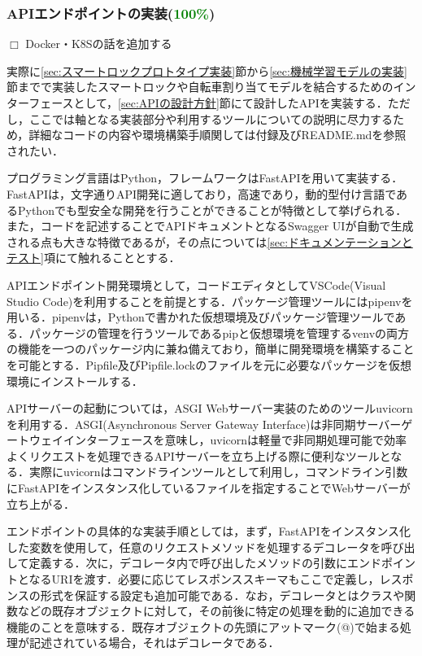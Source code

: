       \subsubsection{APIエンドポイントの実装(\textcolor{green}{100\%})}
        \label{sec:APIエンドポイントの実装}
          \par $\Box$ Docker・K8Sの話を追加する
          \par 実際に\ref{sec:スマートロックプロトタイプ実装}節から\ref{sec:機械学習モデルの実装}節までで実装したスマートロックや自転車割り当てモデルを結合するためのインターフェースとして，\ref{sec:APIの設計方針}節にて設計したAPIを実装する．ただし，ここでは軸となる実装部分や利用するツールについての説明に尽力するため，詳細なコードの内容や環境構築手順関しては付録及びREADME.mdを参照されたい．
          \par プログラミング言語はPython，フレームワークはFastAPIを用いて実装する．FastAPIは，文字通りAPI開発に適しており，高速であり，動的型付け言語であるPythonでも型安全な開発を行うことができることが特徴として挙げられる．また，コードを記述することでAPIドキュメントとなるSwagger UIが自動で生成される点も大きな特徴であるが，その点については\ref{sec:ドキュメンテーションとテスト}項にて触れることとする．
          \par APIエンドポイント開発環境として，コードエディタとしてVSCode(Visual Studio Code)を利用することを前提とする．パッケージ管理ツールにはpipenvを用いる．pipenvは，Pythonで書かれた仮想環境及びパッケージ管理ツールである．パッケージの管理を行うツールであるpipと仮想環境を管理するvenvの両方の機能を一つのパッケージ内に兼ね備えており，簡単に開発環境を構築することを可能とする．Pipfile及びPipfile.lockのファイルを元に必要なパッケージを仮想環境にインストールする．
          \par APIサーバーの起動については，ASGI Webサーバー実装のためのツールuvicornを利用する．ASGI(Asynchronous Server Gateway Interface)は非同期サーバーゲートウェイインターフェースを意味し，uvicornは軽量で非同期処理可能で効率よくリクエストを処理できるAPIサーバーを立ち上げる際に便利なツールとなる．実際にuvicornはコマンドラインツールとして利用し，コマンドライン引数にFastAPIをインスタンス化しているファイルを指定することでWebサーバーが立ち上がる．
          \par エンドポイントの具体的な実装手順としては，まず，FastAPIをインスタンス化した変数を使用して，任意のリクエストメソッドを処理するデコレータを呼び出して定義する．次に，デコレータ内で呼び出したメソッドの引数にエンドポイントとなるURIを渡す．必要に応じてレスポンススキーマもここで定義し，レスポンスの形式を保証する設定も追加可能である．なお，デコレータとはクラスや関数などの既存オブジェクトに対して，その前後に特定の処理を動的に追加できる機能のことを意味する．既存オブジェクトの先頭にアットマーク(@)で始まる処理が記述されている場合，それはデコレータである．
